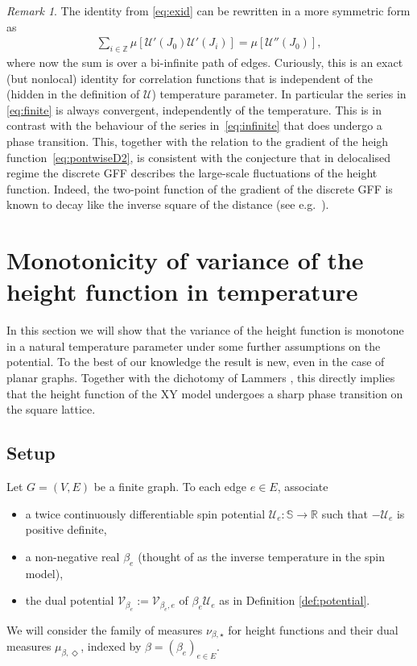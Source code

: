 \documentclass[11pt, reqno]{amsart}
\numberwithin{equation}{section}
\theoremstyle{definition}
\theoremstyle{remark}
\newtheorem{remark}{Remark}
\newcommand{\RR}{\mathbb{R}}
\renewcommand{\c}[1]{\ensuremath{\mathcal{#1}}}
\newcommand{\J}{J}
\newcommand{\exact}{\star}
\newcommand{\coclosed}{\Diamond}
\begin{document}
\begin{remark}
The identity from \eqref{eq:exid} can be rewritten in a more symmetric form as
\begin{align} \label{eq:finite}
\sum_{i\in \mathbb Z}  \mu [\mathcal U'(\J_0)\mathcal U'(\J_i)]=\mu[\mathcal U''(\J_0)],
\end{align}
where now the sum is over a bi-infinite path of edges. Curiously, this is an exact (but nonlocal) identity for correlation functions that is independent of the (hidden in the definition of $\mathcal U$) 
temperature parameter. In particular the series in \eqref{eq:finite} is always convergent, independently of the temperature. This is in contrast with the behaviour of the series in~\eqref{eq:infinite}
that does undergo a phase transition. This, together with the relation to the gradient of the heigh function~\eqref{eq:pontwiseD2}, is consistent with the conjecture that in delocalised 
regime the discrete GFF describes the large-scale fluctuations of the height function. Indeed, the two-point function of the gradient of the discrete GFF is known to decay like the inverse square of the distance (see e.g.~\cite{BauWeb}).
\end{remark}



\section{Monotonicity of variance of the height function in temperature} \label{sec:monot}
In this section we will show that the variance of the height function is monotone in a natural temperature parameter under some further assumptions on the potential.
To the best of our knowledge the result is new, even in the case of planar graphs.
Together with the dichotomy of Lammers \cite{Lammers22}, this directly implies that the height function of the XY model undergoes a sharp phase transition on the square lattice. 

\subsection{Setup} \label{sec:setup2} 
Let $G = (V, E)$ be a finite graph. 
To each edge $e \in E$, associate
\begin{itemize}%
	\item a twice continuously differentiable spin potential $\c{U}_e: \mathbb{S} \to \RR$ such that $-\mathcal U_e$ is positive definite, 
	\item a non-negative real $\beta_e$ (thought of as the inverse temperature in the spin model), 
	\item the dual potential $\c{V}_{\beta_e} := \c{V}_{\beta_e, e}$ of $\beta_e \c{U}_e$ as in Definition \ref{def:potential}. 
\end{itemize}
We will consider the family of measures $\nu_{\beta, \exact}$ 
for height functions and their dual measures $\mu_{\beta, \coclosed}$, indexed by $\beta = (\beta_e)_{e \in E}$. 
\end{document}
